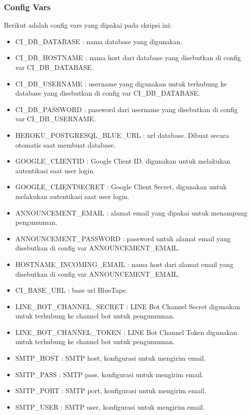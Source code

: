 	\subsubsection{Config Vars}
			Berikut adalah config vars yang dipakai pada skripsi ini: 
		\begin{itemize}
			\item CI\_DB\_DATABASE : nama database yang digunakan.
			\item CI\_DB\_HOSTNAME : nama host dari database yang disebutkan di config var CI\_DB\_DATABASE.
			\item CI\_DB\_USERNAME : username yang digunakan untuk terhubung ke database yang disebutkan di config var CI\_DB\_DATABASE.
			\item CI\_DB\_PASSWORD : password dari username yang disebutkan di config var CI\_DB\_USERNAME.
			\item HEROKU\_POSTGRESQL\_BLUE\_URL : url database. Dibuat secara otomatis saat membuat database.
			\item GOOGLE\_CLIENTID : Google Client ID, digunakan untuk melakukan autentikasi saat user login.
			\item GOOGLE\_CLIENTSECRET : Google Client Secret, digunakan untuk melakukan autentikasi saat user login.
			\item ANNOUNCEMENT\_EMAIL : alamat email yang dipakai untuk menampung pengumuman.
			\item ANNOUNCEMENT\_PASSWORD : password untuk alamat email yang disebutkan di config var ANNOUNCEMENT\_EMAIL.
			\item HOSTNAME\_INCOMING\_EMAIL : nama host dari alamat email yang disebutkan di config var ANNOUNCEMENT\_EMAIL.
			\item CI\_BASE\_URL : base url BlueTape.
			\item LINE\_BOT\_CHANNEL\_SECRET : LINE Bot Channel Secret digunakan untuk terhubung ke channel bot untuk pengumuman.
			\item LINE\_BOT\_CHANNEL\_TOKEN : LINE Bot Channel Token digunakan untuk terhubung ke channel bot untuk pengumuman.
			\item SMTP\_HOST : SMTP host, konfigurasi untuk mengirim email.
			\item SMTP\_PASS : SMTP pass, konfigurasi untuk mengirim email.
			\item SMTP\_PORT : SMTP port, konfigurasi untuk mengirim email.
			\item SMTP\_USER : SMTP user, konfigurasi untuk mengirim email.
		\end{itemize}
		
